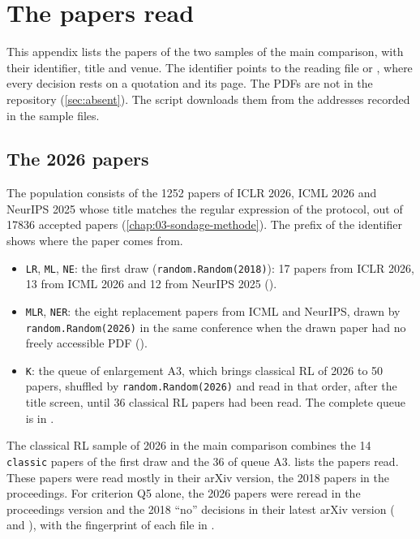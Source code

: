 \chapter{The papers read}
\label{chap:C-articles}

This appendix lists the papers of the two samples of the main comparison, with their identifier,
title and venue. The identifier points to the reading file  or
, where every decision rests on a quotation and its page.
The PDFs are not in the repository (\cref{sec:absent}). The script  downloads
them from the addresses recorded in the sample files.

\section{The 2026 papers}
\label{sec:c-2026}

The population consists of the \num{1252} papers of ICLR 2026, ICML 2026 and NeurIPS 2025 whose title
matches the regular expression of the protocol, out of \num{17836} accepted papers
(\cref{chap:03-sondage-methode}). The prefix of the identifier shows where the paper comes from.
\begin{itemize}
  \item \texttt{LR}, \texttt{ML}, \texttt{NE}: the first draw (\texttt{random.Random(2018)}):
        17 papers from ICLR 2026, 13 from ICML 2026 and 12 from NeurIPS 2025
        ().
  \item \texttt{MLR}, \texttt{NER}: the eight replacement papers from ICML and NeurIPS, drawn by
        \texttt{random.Random(2026)} in the same conference when the drawn paper had no freely
        accessible PDF ().
  \item \texttt{K}: the queue of enlargement A3, which brings classical RL of 2026 to 50 papers, shuffled by \texttt{random.Random(2026)} and
        read in that order, after the title screen, until 36 classical RL papers had been read. The
        complete queue is in .
\end{itemize}
The classical RL sample of 2026 in the main comparison combines the 14 \texttt{classic} papers of
the first draw and the 36 of queue A3.  lists the papers read. These papers were read mostly in their arXiv version, the 2018 papers in the
proceedings. For criterion Q5 alone, the 2026 papers were reread in the proceedings version and the
2018 \enquote{no} decisions in their latest arXiv version
( and ), with the fingerprint of each file in .

